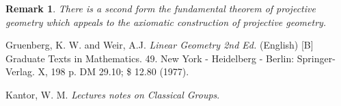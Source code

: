 \documentclass[12pt]{article}
\newtheorem{remark}[thm]{Remark}
\begin{document}
\begin{remark}
There is a second form the fundamental theorem of projective geometry which appeals to the axiomatic construction of projective geometry.
\end{remark}




\providecommand{\bysame}{\leavevmode\hbox to3em{\hrulefill}\thinspace}
\providecommand{\MR}{\relax\ifhmode\unskip\space\fi MR }
\providecommand{\MRhref}[2]{%
\href{http://www.ams.org/mathscinet-getitem?mr=#1}{#2}
}
\providecommand{\href}[2]{#2}
\begin{thebibliography}{10}


Gruenberg, K. W. and Weir, A.J.
\emph{Linear Geometry 2nd Ed.} (English)
[B] Graduate Texts in Mathematics. 49. New York - Heidelberg - Berlin: Springer-Verlag. X, 198 p. DM 29.10; \$ 12.80 (1977).

Kantor, W. M.
\emph{Lectures notes on Classical Groups}.

\end{thebibliography}

\end{document}
